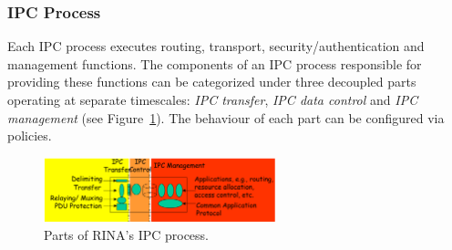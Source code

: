             \subsubsection{IPC Process}

                Each IPC process executes routing, transport, security/authentication and management functions. The components of an IPC process responsible for providing these functions can be categorized under three decoupled parts operating at separate timescales: \emph{IPC transfer}, \emph{IPC data control} and \emph{IPC management} (see Figure~\ref{fig:rina_ipcp}). The behaviour of each part can be configured via policies.

                \begin{figure}[H]
                    \begin{center}
                        \includegraphics[width=0.6\textwidth]{fig/archs_rina-ipcp.png}
                      \caption{Parts of RINA's IPC process.}
                      \label{fig:rina_ipcp}
                    \end{center}
                \end{figure}

